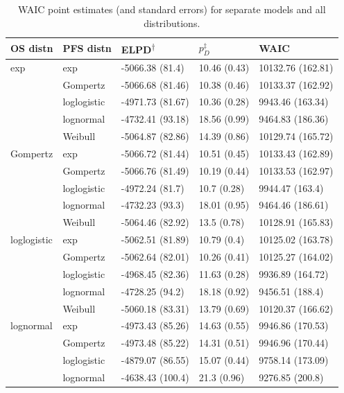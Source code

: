 \documentclass[AMA,STIX1COL]{WileyNJD-v2}
\begin{document}
\begin{table}[!ht]
\centering
\caption{WAIC point estimates (and standard errors) for separate models and all distributions. \label{tab:waic_sep}}
\begin{tabular}{l|l|l|l|l}
\hline
\textbf{OS distn} & \textbf{PFS distn} & \textbf{ELPD\textsuperscript{$\dagger$}} & \textbf{$p_D^{\ddagger}$} & \textbf{WAIC} \\
\hline
exp & exp & -5066.38 (81.4) & 10.46 (0.43) & 10132.76 (162.81)\\
\hline
 & Gompertz & -5066.68 (81.46) & 10.38 (0.46) & 10133.37 (162.92)\\
\hline
 & loglogistic & -4971.73 (81.67) & 10.36 (0.28) & 9943.46 (163.34)\\
\hline
 & lognormal & -4732.41 (93.18) & 18.56 (0.99) & 9464.83 (186.36)\\
\hline
 & Weibull & -5064.87 (82.86) & 14.39 (0.86) & 10129.74 (165.72)\\
\hline
Gompertz & exp & -5066.72 (81.44) & 10.51 (0.45) & 10133.43 (162.89)\\
\hline
 & Gompertz & -5066.76 (81.49) & 10.19 (0.44) & 10133.53 (162.97)\\
\hline
 & loglogistic & -4972.24 (81.7) & 10.7 (0.28) & 9944.47 (163.4)\\
\hline
 & lognormal & -4732.23 (93.3) & 18.01 (0.95) & 9464.46 (186.61)\\
\hline
 & Weibull & -5064.46 (82.92) & 13.5 (0.78) & 10128.91 (165.83)\\
\hline
loglogistic & exp & -5062.51 (81.89) & 10.79 (0.4) & 10125.02 (163.78)\\
\hline
 & Gompertz & -5062.64 (82.01) & 10.26 (0.41) & 10125.27 (164.02)\\
\hline
 & loglogistic & -4968.45 (82.36) & 11.63 (0.28) & 9936.89 (164.72)\\
\hline
 & lognormal & -4728.25 (94.2) & 18.18 (0.92) & 9456.51 (188.4)\\
\hline
 & Weibull & -5060.18 (83.31) & 13.79 (0.69) & 10120.37 (166.62)\\
\hline
lognormal & exp & -4973.43 (85.26) & 14.63 (0.55) & 9946.86 (170.53)\\
\hline
 & Gompertz & -4973.48 (85.22) & 14.31 (0.51) & 9946.96 (170.44)\\
\hline
 & loglogistic & -4879.07 (86.55) & 15.07 (0.44) & 9758.14 (173.09)\\
\hline
 & lognormal & -4638.43 (100.4) & 21.3 (0.96) & 9276.85 (200.8)\\

\end{tabular}
\end{table}
\end{document}
